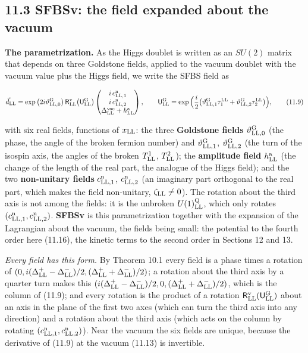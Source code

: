 \documentclass[
  10pt,
]{article}
\begin{document}
\hypertarget{sfbsv-the-field-expanded-about-the-vacuum}{%
\subsection{11.3 SFBSv: the field expanded about the
vacuum}\label{sfbsv-the-field-expanded-about-the-vacuum}}

\textbf{The parametrization.} As the Higgs doublet is written as an
\(SU(2)\) matrix that depends on three Goldstone fields, applied to the
vacuum doublet with the vacuum value plus the Higgs field, we write the
SFBS field as

\[\vec d_{\rm LL}=\exp\big(2i\vartheta^{\rm G}_{{\rm LL},0}\big)\,\mathsf R^{\rm v}_{\rm LL}\big(\mathsf U^{\rm G}_{\rm LL}\big)\begin{pmatrix}i\,c^{\rm n}_{{\rm LL},1}\\i\,c^{\rm n}_{{\rm LL},2}\\\Delta^{\rm vac}_{\rm LL}+h^{\rm a}_{\rm LL}\end{pmatrix},\qquad\mathsf U^{\rm G}_{\rm LL}=\exp\Big(\frac i2\big(\vartheta^{\rm G}_{{\rm LL},1}\tau^{\rm LL}_1+\vartheta^{\rm G}_{{\rm LL},2}\tau^{\rm LL}_2\big)\Big),\tag{11.9}\]

with six real fields, functions of \(x_{\rm LL}\): the three
\textbf{Goldstone fields} \(\vartheta^{\rm G}_{{\rm LL},0}\) (the phase,
the angle of the broken fermion number) and
\(\vartheta^{\rm G}_{{\rm LL},1}\), \(\vartheta^{\rm G}_{{\rm LL},2}\)
(the turn of the isospin axis, the angles of the broken
\(T^1_{\rm LL}\), \(T^2_{\rm LL}\)); the \textbf{amplitude field}
\(h^{\rm a}_{\rm LL}\) (the change of the length of the real part, the
analogue of the Higgs field); and the two \textbf{non-unitary fields}
\(c^{\rm n}_{{\rm LL},1}\), \(c^{\rm n}_{{\rm LL},2}\) (an imaginary
part orthogonal to the real part, which makes the field non-unitary,
\(\zeta_{\rm LL}\ne0\)). The rotation about the third axis is not among
the fields: it is the unbroken \(U(1)^{\rm Q}_{\rm LL}\), which only
rotates \((c^{\rm n}_{{\rm LL},1},c^{\rm n}_{{\rm LL},2})\).
\textbf{SFBSv} is this parametrization together with the expansion of
the Lagrangian about the vacuum, the fields being small: the potential
to the fourth order here (11.16), the kinetic terms to the second order
in Sections 12 and 13.

\emph{Every field has this form.} By Theorem 10.1 every field is a phase
times a rotation of
\((0,i(\Delta^+_{\rm LL}-\Delta^-_{\rm LL})/2,(\Delta^+_{\rm LL}+\Delta^-_{\rm LL})/2)\);
a rotation about the third axis by a quarter turn makes this
\((i(\Delta^+_{\rm LL}-\Delta^-_{\rm LL})/2,0,(\Delta^+_{\rm LL}+\Delta^-_{\rm LL})/2)\),
which is the column of (11.9); and every rotation is the product of a
rotation \(\mathsf R^{\rm v}_{\rm LL}(\mathsf U^{\rm G}_{\rm LL})\)
about an axis in the plane of the first two axes (which can turn the
third axis into any direction) and a rotation about the third axis
(which acts on the column by rotating
\((c^{\rm n}_{{\rm LL},1},c^{\rm n}_{{\rm LL},2})\)). Near the vacuum
the six fields are unique, because the derivative of (11.9) at the
vacuum (11.13) is invertible.
\end{document}
